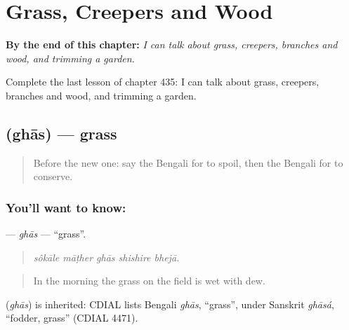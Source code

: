 
\chapter{Grass, Creepers and Wood}
\label{ch:bn-grass-creepers-and-wood}

\begin{chapteropening}
\textbf{By the end of this chapter:} \emph{I can talk about grass, creepers, branches and wood, and trimming a garden.}

Complete the last lesson of chapter 435: I can talk about grass, creepers, branches and wood, and trimming a garden.
\end{chapteropening}

\section[\texorpdfstring{\bn{ঘাস} (ghās)}{ঘাস (ghās)}]{ (ghās) — grass}

\label{lesson:BN-C435-ghas}



\begin{quote}
Before the new one: say the Bengali for to spoil, then the Bengali for to conserve.
\end{quote}

\subsection*{You'll want to know: }
\textbf{} — \emph{ghās} — \textquotedblleft{}grass\textquotedblright{}.

\begin{quote}
    
\end{quote}

\begin{quote}
\emph{sôkāle māṭher ghās shishire bhejā.}
\end{quote}

\begin{quote}
In the morning the grass on the field is wet with dew.
\end{quote}

\begin{cousinweb}
\textbf{} (\emph{ghās}) is inherited: CDIAL lists Bengali \emph{ghās}, \textquotedblleft{}grass\textquotedblright{}, under Sanskrit \emph{ghāsá}, \textquotedblleft{}fodder, grass\textquotedblright{} (CDIAL 4471).
\end{cousinweb}

